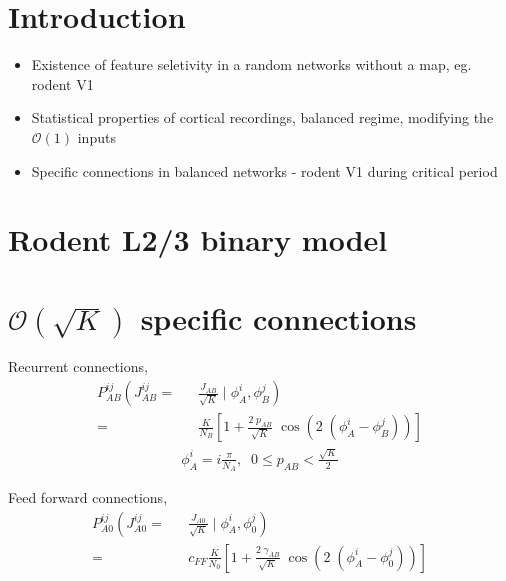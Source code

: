 \documentclass[%
 reprint,
 amsmath,amssymb,
 aps,
]{revtex4-1}
\begin{document}
\tableofcontents  

\section{\label{sec:level1}Introduction}

\begin{itemize}
   \item Existence of feature seletivity in a random networks without a map, eg. rodent V1  
   \item Statistical properties of cortical recordings, balanced regime, modifying the $\mathcal{O}(1)$ inputs
   \item  Specific connections in balanced networks - rodent V1 during critical period
\end{itemize}

\section{\label{sec:level2}Rodent L2/3 binary model}



% 

\section{\label{sec:citeref} $\mathcal{O} (\sqrt{K}) $ specific connections}

Recurrent connections, \\
\begin{eqnarray}
P_{AB}^{ij} \left(J_{AB}^{ij} \right.=&&\left. \frac{J_{AB}}{\sqrt{K}} \; \Bigg| \; \phi_A^i, \phi_B^j \right)\nonumber\\
=&& \frac{K}{N_B}\left[ 1 + \frac{2 \; p_{AB}}{\sqrt{K}}\; \cos(2 \; ( \phi^i_A - \phi_B^j)) \right]
\end{eqnarray}
\begin{eqnarray}
\phi_A^i = i \frac{\pi}{N_A},  \;\; 0 \leq p_{AB} < \frac{\sqrt{K}}{2} \nonumber
\end{eqnarray}

Feed forward connections,
\begin{eqnarray}
P_{A0}^{ij} \left( J^{ij}_{A0} \right.=&&\left. \frac{J_{A0}}{\sqrt{K}} \; \Bigg| \; \phi_A^i, \phi_0^j \right)\nonumber \\
=&& c_{FF} \frac{K}{N_{0}} \left[ 1 + \frac{2 \;\gamma_{AB}}{\sqrt{K}}\; \cos(2 \; ( \phi^i_A - \phi_0^j)) \right]
 \end{eqnarray}
\end{document}
